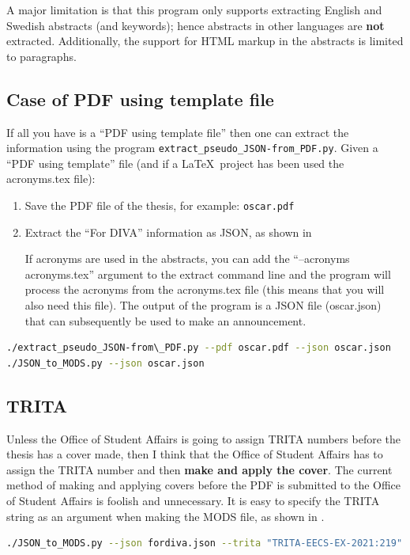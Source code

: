 A major limitation is that this program only supports extracting English and Swedish abstracts (and keywords); hence abstracts in other languages are \textbf{not} extracted. Additionally, the support for HTML markup in the abstracts is limited to paragraphs.



\subsection{Case of PDF using template file}
\label{sec:extractingJSONPDF}
If all you have is a ``PDF using template file'' then one can extract the information using the program \texttt{extract\_pseudo\_JSON-from\_PDF.py}.  Given a ``PDF using template'' file (and if a \LaTeX~project has been used the acronyms.tex file):
\begin{enumerate}
    \item Save the PDF file of the thesis, for example: \texttt{oscar.pdf}
    \item Extract the “For DIVA” information as JSON, as shown in 

    If acronyms are used in the abstracts, you can add the “--acronyms acronyms.tex” argument to the extract command line and the program will process the acronyms from the acronyms.tex file (this means that you will also need this file). The output of the program is a JSON file (oscar.json) that can subsequently be used to make an announcement.
\end{enumerate}
\begin{lstlisting}[basicstyle=\footnotesize, language={bash}, caption={Commands to extract pseudo JSON from the PDF file for Oscar}, label=lst:AdminextractPseudoJSONFromPDFforOscarFileToJSON]
./extract_pseudo_JSON-from\_PDF.py --pdf oscar.pdf --json oscar.json
./JSON_to_MODS.py --json oscar.json
\end{lstlisting}


\subsection{TRITA}
Unless the Office of Student Affairs is going to assign TRITA numbers before the thesis has a cover made, then I think that the Office of Student Affairs has to assign the TRITA number and then \textbf{make and apply the cover}. The current method of making and applying covers before the PDF is submitted to the Office of Student Affairs is foolish and unnecessary. It is easy to specify the TRITA string as an argument when making the MODS file, as shown in .
\begin{lstlisting}[basicstyle=\footnotesize, language={bash}, caption={Command to make a MODS file with a specified TRITA string}, label=lst:specifyTRITA]
./JSON_to_MODS.py --json fordiva.json --trita "TRITA-EECS-EX-2021:219"
\end{lstlisting}

